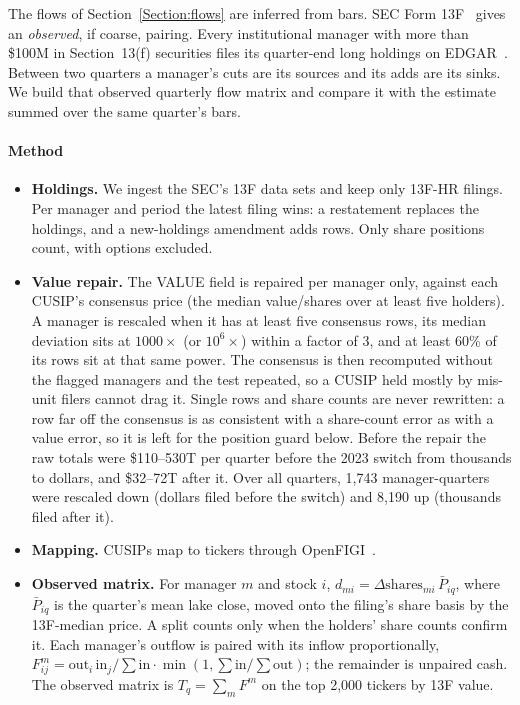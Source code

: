 \documentclass[preprint,3p,twocolumn]{elsarticle}
\begin{document}
The flows of Section~\ref{Section:flows} are inferred from bars. SEC Form 13F~\cite{sec13f} gives an \emph{observed}, if coarse, pairing. Every institutional manager with more than \$100M in Section~13(f) securities files its quarter-end long holdings on EDGAR~\cite{edgar}. Between two quarters a manager's cuts are its sources and its adds are its sinks. We build that observed quarterly flow matrix and compare it with the estimate summed over the same quarter's bars.

\paragraph{Method}
\begin{itemize}
\item \textbf{Holdings.} We ingest the SEC's 13F data sets and keep only 13F-HR filings. Per manager and period the latest filing wins: a restatement replaces the holdings, and a new-holdings amendment adds rows. Only share positions count, with options excluded.
\item \textbf{Value repair.} The VALUE field is repaired per manager only, against each CUSIP's consensus price (the median value/shares over at least five holders). A manager is rescaled when it has at least five consensus rows, its median deviation sits at $1000\times$ (or $10^6\times$) within a factor of 3, and at least 60\% of its rows sit at that same power. The consensus is then recomputed without the flagged managers and the test repeated, so a CUSIP held mostly by mis-unit filers cannot drag it. Single rows and share counts are never rewritten: a row far off the consensus is as consistent with a share-count error as with a value error, so it is left for the position guard below. Before the repair the raw totals were \$110--530T per quarter before the 2023 switch from thousands to dollars, and \$32--72T after it. Over all quarters, 1,743 manager-quarters were rescaled down (dollars filed before the switch) and 8,190 up (thousands filed after it).
\item \textbf{Mapping.} CUSIPs map to tickers through OpenFIGI~\cite{openfigi}.
\item \textbf{Observed matrix.} For manager $m$ and stock $i$, $d_{mi}=\Delta\text{shares}_{mi}\,\bar P_{iq}$, where $\bar P_{iq}$ is the quarter's mean lake close, moved onto the filing's share basis by the 13F-median price. A split counts only when the holders' share counts confirm it. Each manager's outflow is paired with its inflow proportionally, $F^{m}_{ij}=\mathrm{out}_i\,\mathrm{in}_j/\sum\mathrm{in}\cdot\min(1,\sum\mathrm{in}/\sum\mathrm{out})$; the remainder is unpaired cash. The observed matrix is $T_q=\sum_m F^m$ on the top 2,000 tickers by 13F value.

\end{itemize}
\end{document}
